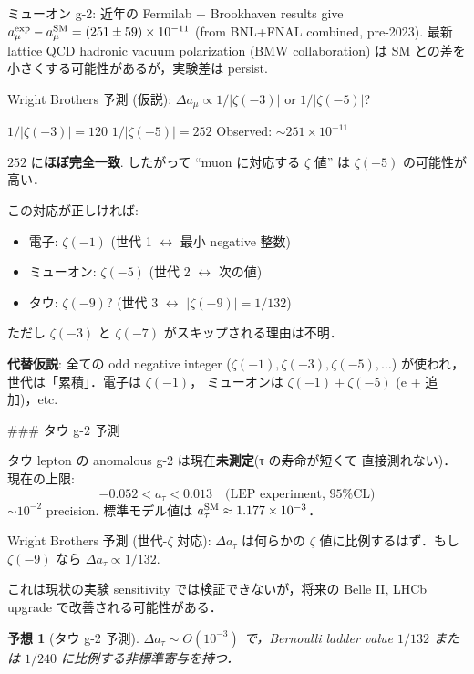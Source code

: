 \documentclass[11pt,a4paper]{article}
\newtheorem{conjecture}{予想}
\begin{document}
ミューオン g-2: 近年の Fermilab + Brookhaven results give $a_\mu^{\rm exp} - a_\mu^{\rm SM} = (251 \pm 59) \times 10^{-11}$ (from BNL+FNAL combined, pre-2023). 最新 lattice QCD hadronic vacuum polarization (BMW collaboration) は SM との差を小さくする可能性があるが，実験差は persist.

Wright Brothers 予測 (仮説): $\Delta a_\mu \propto 1/|\zeta(-3)|$ or
$1/|\zeta(-5)|$?

$1/|\zeta(-3)| = 120$
$1/|\zeta(-5)| = 252$
Observed: $\sim 251 \times 10^{-11}$

$252$ に\textbf{ほぼ完全一致}. したがって ``muon に対応する $\zeta$ 値''
は $\zeta(-5)$ の可能性が高い．

この対応が正しければ:
\begin{itemize}
\item 電子: $\zeta(-1)$ (世代 1 $\leftrightarrow$ 最小 negative 整数)
\item ミューオン: $\zeta(-5)$ (世代 2 $\leftrightarrow$ 次の値)
\item タウ: $\zeta(-9)$? (世代 3 $\leftrightarrow$ $|\zeta(-9)|= 1/132$)
\end{itemize}

ただし $\zeta(-3)$ と $\zeta(-7)$ がスキップされる理由は不明．

\textbf{代替仮説}: 全ての odd negative integer ($\zeta(-1), \zeta(-3),
\zeta(-5), \ldots$) が使われ，世代は「累積」．電子は $\zeta(-1)$，
ミューオンは $\zeta(-1) + \zeta(-5)$ (e + 追加)，etc.

### タウ g-2 予測

タウ lepton の anomalous g-2 は現在\textbf{未測定}(τ の寿命が短くて
直接測れない)．現在の上限:
\begin{equation}
-0.052 < a_\tau < 0.013 \quad\text{(LEP experiment, 95\% CL)}
\end{equation}
$\sim 10^{-2}$ precision. 標準モデル値は $a_\tau^{\rm SM} \approx 1.177 \times 10^{-3}$．

Wright Brothers 予測 (世代-$\zeta$ 対応): $\Delta a_\tau$ は何らかの
$\zeta$ 値に比例するはず．もし $\zeta(-9)$ なら $\Delta a_\tau \propto 1/132$.

これは現状の実験 sensitivity では検証できないが，将来の Belle II,
LHCb upgrade で改善される可能性がある．

\begin{conjecture}[タウ g-2 予測]
$\Delta a_\tau \sim O(10^{-3})$ で，Bernoulli ladder value $1/132$ または
$1/240$ に比例する非標準寄与を持つ．
\end{conjecture}
\end{document}
